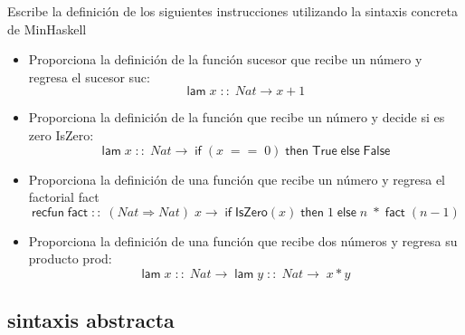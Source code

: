     \begin{exercise}
    Escribe la definición de los siguientes instrucciones utilizando la sintaxis concreta de \textsf{MinHaskell}\\

	\begin{itemize}
		\item Proporciona la definición de la función sucesor que recibe un número y regresa el sucesor \textsf{suc}: 
			$$ \textsf{lam}\; x\;::\; \textit{Nat} \rightarrow x + 1$$
		\item Proporciona la definición de la función que recibe un número y decide si es zero \textsf{IsZero}:
			 $$ \textsf{lam}\; x\;::\; \textit{Nat} \rightarrow\; \textsf{if}\; (x\; ==\; 0) \; \textsf{then}\; \textsf{True}\; \textsf{else}\; \textsf{False}$$
		\item Proporciona la definición de una función que recibe un número y regresa el factorial \textsf{fact}
			 $$ \textsf{recfun}\; \textsf{fact}\; ::\; (\textit{Nat} \Rightarrow \textit{Nat})\; x \rightarrow\; \textsf{if}\; \textsf{IsZero}(x)\; \textsf{then}\; 1\; \textsf{else}\; n\; *\; \textsf{fact}\; (n-1)$$
		\item Proporciona la definición de una función que recibe dos números y regresa su producto \textsf{prod}:
			$$ \textsf{lam}\; x\; ::\; Nat \rightarrow\; \textsf{lam}\; y\; ::\; Nat \rightarrow\; x*y$$
	\end{itemize}

    \end{exercise}

\subsection{sintaxis abstracta}

